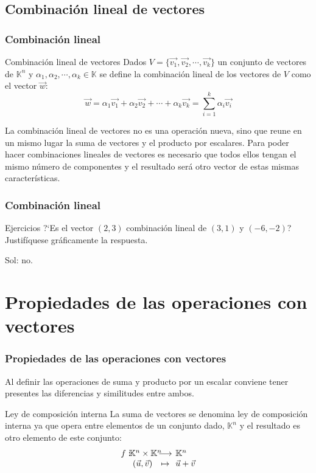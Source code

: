 \documentclass{beamer}
\begin{document}
\subsection{Combinaci\'on lineal de vectores}
\begin{frame}
  \frametitle{Combinaci\'on lineal}
  
  \begin{block}{Combinaci\'on lineal de vectores}
Dados $V = \{\vec{v_1},\vec{v_2},\cdots,\vec{v_k}\}$ un conjunto de vectores de $\mathbb{K}^n$ y $\alpha_1,\alpha_2,\cdots,\alpha_k \in \mathbb{K}$ se define la combinaci\'on lineal de los vectores de $V$ como el vector $\vec{w}$:
\[\vec{w} = \alpha_1\vec{v_1}+\alpha_2\vec{v_2}+\cdots+\alpha_k\vec{v_k} =\sum_{i=1}^{k}\alpha_i\vec{v_i} \]
\end{block}
La combinaci\'on lineal de vectores no es una operaci\'on nueva, sino que reune en un mismo lugar la suma de vectores y el producto por escalares. Para poder hacer combinaciones lineales de vectores es necesario que todos ellos tengan el mismo n\'umero de componentes y el resultado ser\'a otro vector de estas mismas caracter\'isticas.
\end{frame}

\begin{frame}
  \frametitle{Combinaci\'on lineal}
    \begin{block}{Ejercicios}
?`Es el vector $(2,3)$ combinaci\'on lineal de $(3,1)$ y $(-6,-2)$? Justif\'iquese gr\'aficamente la respuesta.
\end{block}
Sol: no.
\end{frame}


\section{Propiedades de las operaciones con vectores}
\begin{frame}
  \frametitle{Propiedades de las operaciones con vectores}
  Al definir las operaciones de suma y producto por un escalar conviene tener presentes las diferencias y similitudes entre ambos.
    \begin{block}{Ley de composici\'on interna}
La suma de vectores se denomina ley de composici\'on interna ya que opera entre elementos de un conjunto dado, $\mathbb{K}^n$ y el resultado es otro elemento de este conjunto:
\[\begin{array}{r@{\hspace{-2pt}}c@{\hspace{-4pt}}
c@{\hspace{4pt}}l}
f:&\mathbb K^n\times \mathbb K^n&\longrightarrow&\mathbb K^n\\
  &(\vec{u}, \vec{v})\ \ &\mapsto&\vec u + \vec v
\end{array}\]
\end{block}
\end{frame}
\end{document}
